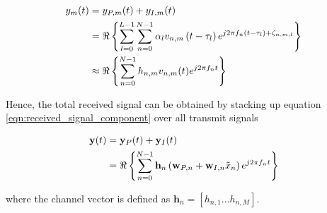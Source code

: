 \begin{align}\label{eqn:received_signal_component}
  {y_m}(t) &= {y_{P,m}}(t) + {y_{I,m}}(t) \hfill \\
   &= \Re \left\{ {\sum\limits_{l = 0}^{L - 1} {\sum\limits_{n = 0}^{N - 1} {{\alpha _l}} } {v_{n,m}}\left( {t - {\tau _l}} \right){e^{j2\pi {f_n}\left( {t - {\tau _l}} \right) + {\zeta _{n,m,l}}}}} \right\} \hfill \\
   &\approx \Re \left\{ {\sum\limits_{n = 0}^{N - 1} {{h_{n,m}}} {v_{n,m}}(t){e^{j2\pi {f_n}t}}} \right\} \hfill
\end{align}

Hence, the total received signal can be obtained by stacking up equation \ref{eqn:received_signal_component} over all transmit signals

\begin{align}\label{eqn:received_signal}
  {\mathbf{y}}(t) &= {{\mathbf{y}}_P}(t) + {{\mathbf{y}}_I}(t) \hfill \\
   &= \Re \left\{ {\sum\limits_{n = 0}^{N - 1} {{{\mathbf{h}}_n}} \left( {{{\mathbf{w}}_{P,n}} + {{\mathbf{w}}_{I,n}}{{\tilde x}_n}} \right){e^{j2\pi {f_n}t}}} \right\} \hfill
\end{align}

where the channel vector is defined as ${{\mathbf{h}}_n} = \left[ {{h_{n,1}} \ldots {h_{n,M}}} \right]$. 